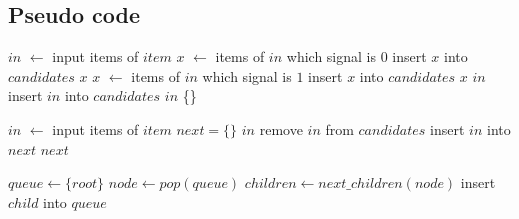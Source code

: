 \documentclass[12pt,a4paper]{article}
\begin{document}
\begin{CJK*}{UTF8}{song}
\subsection{Pseudo code}

{\linespread{1}

\begin{algorithm}
\caption{$static\_analysis(candidates, item)$}
\begin{algorithmic}[1]
\STATE $in$ $\leftarrow$ input items of $item$
    \STATE $x$ $\leftarrow$ items of $in$ which signal is $0$
        \STATE insert $x$ into $candidates$
        \RETURN $x$
    \ENDIF
{}
    \STATE $x$ $\leftarrow$ items of $in$ which signal is $1$
        \STATE insert $x$ into $candidates$
        \RETURN $x$
    \ENDIF
{}
    \RETURN $in$
\ELSE
    \STATE insert $in$ into $candidates$
    \RETURN $in$
\ENDIF
\RETURN \{\}
\end{algorithmic}
\end{algorithm}

\begin{algorithm}
\caption{$dynamic\_analysis(candidates, item)$}
\begin{algorithmic}[1]
\STATE $in$ $\leftarrow$ input items of $item$
\STATE $next = \{\}$
    \RETURN $in$
\ENDIF
{}
        \STATE remove $in$ from $candidates$
        \STATE insert $in$ into $next$
    \ENDIF
\ENDFOR
\RETURN $next$
\end{algorithmic}
\end{algorithm}

\begin{algorithm}
\caption{$breadth\_first\_traversal(root, next\_children)$}
\begin{algorithmic}[1]
\STATE $queue \leftarrow \{root\}$
    \STATE $node \leftarrow pop(queue)$
    \STATE $children \leftarrow next\_children(node)$
    \STATE insert $child$ into $queue$
\ENDWHILE
\end{algorithmic}
\end{algorithm}

}

\end{CJK*}
\end{document}
